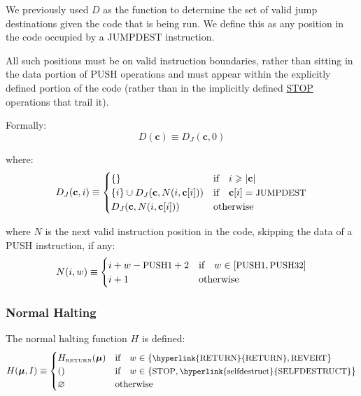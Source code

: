 \documentclass[9pt,oneside]{amsart}
\makeatletter
\newcommand{\linkdest}[1]{\Hy@raisedlink{\hypertarget{#1}{}}}
\makeatother
\begin{document}
\begin{multicols}{2}
We previously used $D$ as the function to determine the set of valid jump destinations given the code that is being run. We define this as any position in the code occupied by a {\small JUMPDEST} instruction.

All such positions must be on valid instruction boundaries, rather than sitting in the data portion of {\small PUSH} operations and must appear within the explicitly defined portion of the code (rather than in the implicitly defined \hyperlink{stop}{{\small STOP}} operations that trail it).

Formally:
\begin{equation}
D(\mathbf{c}) \equiv D_{J}(\mathbf{c}, 0)
\end{equation}

where:
\begin{equation}
D_{J}(\mathbf{c}, i) \equiv \begin{cases}
\{\} & \text{if} \quad i \geqslant |\mathbf{c}|  \\
\{ i \} \cup D_{J}(\mathbf{c}, N(i, \mathbf{c}[i])) & \text{if} \quad \mathbf{c}[i] = \text{\small JUMPDEST} \\
D_{J}(\mathbf{c}, N(i, \mathbf{c}[i])) & \text{otherwise} \\
\end{cases}
\end{equation}

where $N$ is the next valid instruction position in the code, skipping the data of a {\small PUSH} instruction, if any:
\begin{equation}
N(i, w) \equiv \begin{cases}
i + w - \text{\small PUSH1} + 2 & \text{if} \quad w \in [\text{\small PUSH1}, \text{\small PUSH32}] \\
i + 1 & \text{otherwise} \end{cases}
\end{equation}

\subsubsection{Normal Halting}\hypertarget{normal_halting_function_H}{}\linkdest{hhalt}

The normal halting function $H$ is defined:
\begin{equation}
H(\boldsymbol{\mu}, I) \equiv \begin{cases}
H_{\text{\tiny RETURN}}(\boldsymbol{\mu}) & \text{if} \quad w \in \{\text{\small \hyperlink{RETURN}{RETURN}}, \text{\small REVERT}\} \\
() & \text{if} \quad w \in \{ \text{\small STOP}, \text{\small \hyperlink{selfdestruct}{SELFDESTRUCT}} \} \\
\varnothing & \text{otherwise}
\end{cases}
\end{equation}


\end{multicols}
\end{document}
